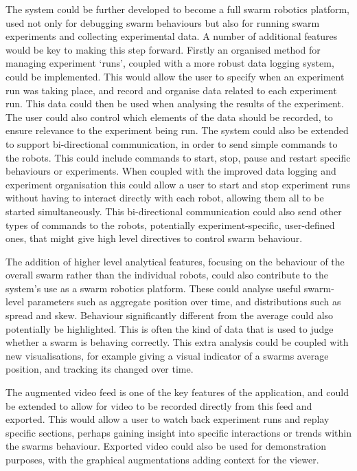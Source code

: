 The system could be further developed to become a full swarm robotics platform, used not only for debugging swarm behaviours but also for running swarm experiments and collecting experimental data. A number of additional features would be key to making this step forward. Firstly an organised method for managing experiment `runs', coupled with a more robust data logging system, could be implemented. This would allow the user to specify when an experiment run was taking place, and record and organise data related to each experiment run. This data could then be used when analysing the results of the experiment. The user could also control which elements of the data should be recorded, to ensure relevance to the experiment being run. The system could also be extended to support bi-directional communication, in order to send simple commands to the robots. This could include commands to start, stop, pause and restart specific behaviours or experiments. When coupled with the improved data logging and experiment organisation this could allow a user to start and stop experiment runs without having to interact directly with each robot, allowing them all to be started simultaneously. This bi-directional communication could also send other types of commands to the robots, potentially experiment-specific, user-defined ones, that might give high level directives to control swarm behaviour.

The addition of higher level analytical features, focusing on the behaviour of the overall swarm rather than the individual robots, could also contribute to the system's use as a swarm robotics platform. These could analyse useful swarm-level parameters such as aggregate position over time, and distributions such as spread and skew. Behaviour significantly different from the average could also potentially be highlighted. This is often the kind of data that is used to judge whether a swarm is behaving correctly. This extra analysis could be coupled with new visualisations, for example giving a visual indicator of a swarms average position, and tracking its changed over time.

The augmented video feed is one of the key features of the application, and could be extended to allow for video to be recorded directly from this feed and exported. This would allow a user to watch back experiment runs and replay specific sections, perhaps gaining insight into specific interactions or trends within the swarms behaviour. Exported video could also be used for demonstration purposes, with the graphical augmentations adding context for the viewer.

